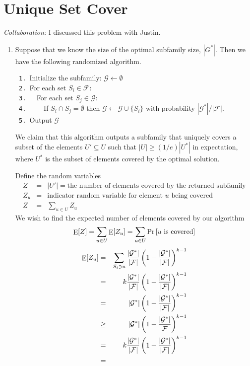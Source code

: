 \documentclass[12pt]{article}
\def\Exp#1{\mathop{\rm {E}}[#1]}
\def\PR#1{\mathop{\rm {Pr}}\left[#1\right]}
\begin{document}
\section{Unique Set Cover}

\textit{Collaboration:} I discussed this problem with Justin.

\begin{enumerate}
\item %
Suppose that we know the size of the optimal subfamily size, $|G^*|$.
Then we have the following randomized algorithm.

\verb+ 1. +Initialize the subfamily: $\mathcal{G} \gets \emptyset$\\
\verb+ 2. +For each set $S_i \in \mathcal{F}$:\\
\verb+ 3.   +For each set $S_j \in \mathcal{G}$:\\
\verb+ 4.     +If $S_i \cap S_j = \emptyset$ then $\mathcal{G} \gets \mathcal{G} \cup \{S_i\}$ with probability $|\mathcal{G}^*| / |\mathcal{F}|$.\\
\verb+ 5. +Output $\mathcal{G}$

We claim that this algorithm outputs a subfamily that uniquely covers
a subset of the elements $U' \subseteq U$ such that
$|U| \ge (1/e)|U^*|$ in expectation,
where $U^*$ is the subset of elements covered by the
optimal solution.

Define the random variables
%
\begin{eqnarray*}
Z & = & |U'| = \textrm{the number of elements covered by the returned subfamily}\\
Z_u & = & \textrm{indicator random variable for element $u$ being covered}\\
Z & = & \sum_{u \in U} Z_u
\end{eqnarray*}
%
We wish to find the expected number of elements covered by our algorithm
%
\begin{displaymath}
\Exp{Z} = \sum_{u \in U}\Exp{Z_u} = \sum_{u \in U}\PR{u \textrm{ is covered}}
\end{displaymath}
%
\begin{eqnarray*}
\Exp{Z_u} & = & \sum_{S_i \ni u}\frac{|\mathcal{G}^*|}{|\mathcal{F}|}\left(1 - \frac{|\mathcal{G}^*|}{|\mathcal{F}|}\right)^{k-1}\\
          & = & k\frac{|\mathcal{G}^*|}{|\mathcal{F}|}\left(1 - \frac{|\mathcal{G}^*|}{|\mathcal{F}|}\right)^{k-1}\\
          & = & |\mathcal{G}^*|\left(1 - \frac{|\mathcal{G}^*|}{|\mathcal{F}|}\right)^{k-1}\\
          & \ge & |\mathcal{G}^*|\left(1 - \frac{|\mathcal{G}^*|}{\mathcal{F}}\right)^{k-1}\\
          & = & k\frac{|\mathcal{G}^*|}{|\mathcal{F}|}\left(1 - \frac{|\mathcal{G}^*|}{|\mathcal{F}|}\right)^{k-1}\\
          & = & 
\end{eqnarray*}


\end{enumerate}
\end{document}
